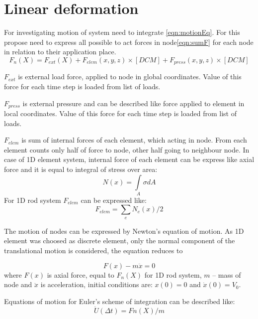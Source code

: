\section*{Linear deformation}
For investigating motion of system need to integrate \eqref{eqn:motionEq}. For
this propose need to express all possible to act forces in node\eqref{eqn:sumF}
for each node in relation to their application place. 
\begin{equation}\label{eqn:sumF}
   F_n(X)=
   F_{ext}(X)+
   F_{elem}(x, y, z)\times[DCM]+
   F_{press}(x, y, z)\times[DCM]
\end{equation}\par
$F_{ext}$ is external load force, applied to node in global coordinates. Value
of this force for each time step is loaded from list of loads.\par $F_{press}$
is external pressure and can be described like force applied to element in local
coordinates. Value of this force for each time step is loaded from list of
loads.\par $F_{elem}$ is sum of internal forces of each element, which acting in
node. From each element counts only half of force to node, other half going to
neighbour node. In case of 1D element system, internal force of each element can
be express like axial force and it is equal to integral of stress over area:
\begin{equation}\label{eqn:Nx}
  N(x)= \int\limits_A \sigma dA
\end{equation}
For 1D rod system $F_{elem}$ can be expressed like:
\begin{equation}\label{eqn:Felem}
  F_{elem}= \sum_{e}N_e(x)/2
\end{equation}\par
The motion of nodes can be expressed by Newton's equation of motion. As 1D
element was choosed as discrete element, only the normal component of the
translational motion is considered, the equation reduces to\par
\begin{equation}\label{eqn:motionEq}
   F(x)-m\ddot{x}=0
\end{equation}
where $F(x)$ is axial force, equal to $F_n(X)$ for 1D rod system, $m$ – mass of
node and $\ddot{x}$ is acceleration, initial conditions are: $x(0)=0$ and
$\dot{x}(0)=V_0$.\par Equations of motion for Euler's scheme of integration can
be described like:
\begin{equation}\label{eqn:Accel}
  \ddot{U}(\Delta t)=Fn(X)/m
\end{equation}
